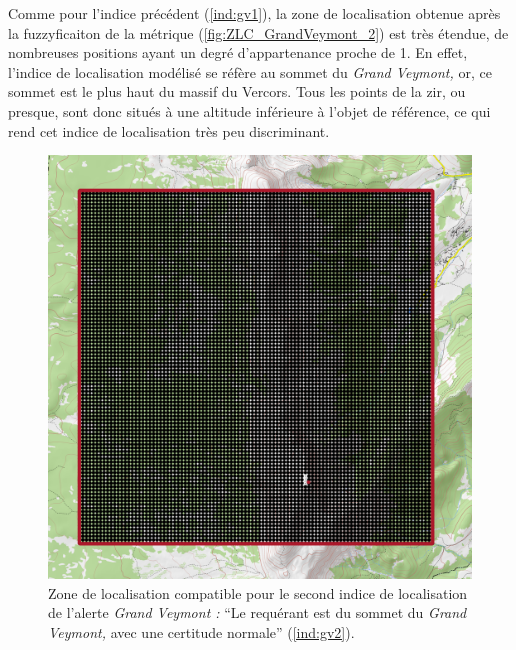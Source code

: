 %   

Comme pour l'indice précédent (\ref{ind:gv1}), la zone de localisation
obtenue après la fuzzyficaiton de la métrique
(\autoref{fig:ZLC_GrandVeymont_2}) est très étendue, de nombreuses
positions ayant un degré d'appartenance proche de 1. En effet,
l'indice de localisation modélisé se réfère au sommet du \emph{Grand
  Veymont,} or, ce sommet est le plus haut du massif du Vercors. Tous
les points de la \ac{zir}, ou presque, sont donc situés à une altitude
inférieure à l'objet de référence, ce qui rend cet indice de
localisation très peu discriminant.

\begin{figure}
  \centering
  \includegraphics{./figures/Sous_GrandVeymont.png}
  \caption{Zone de localisation compatible pour le second indice de
    localisation de l'alerte \emph{Grand Veymont :} \enquote{Le
      requérant est \protect{} du sommet du
      \emph{Grand Veymont,} avec une certitude normale}
    (\ref{ind:gv2}).}
  \label{fig:ZLC_GrandVeymont_2}
\end{figure}

